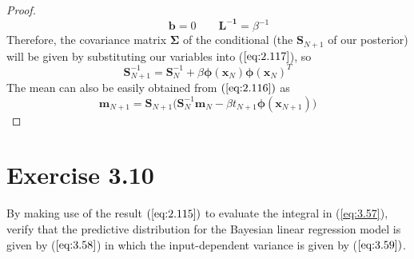 \begin{proof}
\begin{equation*}
        \hspace{2em}
        \mathbf{b} = 0
        \hspace{2em}
        \mathbf{L^{-1}} = \beta^{-1}
    \end{equation*}
    Therefore, the covariance matrix $\mathbf{\Sigma}$ of the conditional (the $\mathbf{S}_{N + 1}$ 
    of our posterior) will be given by substituting our variables into ($\ref{eq:2.117}$), so
    \begin{equation*}
        \mathbf{S}_{N + 1}^{-1} = \mathbf{S}_N^{-1} + \beta \bm{\phi}(\mathbf{x}_N)\bm{\phi}(\mathbf{x}_N)^T
    \end{equation*}
    The mean can also be easily obtained from $(\ref{eq:2.116})$ as
    \begin{equation*}
        \mathbf{m}_{N + 1}
        = \mathbf{S}_{N + 1}\big(\mathbf{S}_N^{-1} \mathbf{m}_N 
             - \beta t_{N + 1} \bm{\phi}(\mathbf{x}_{N + 1})\big)
    \end{equation*}
\end{proof}

\section*{Exercise 3.10}
By making use of the result $(\ref{eq:2.115})$ to evaluate the integral
in (\ref{eq:3.57}), verify that the predictive distribution for the Bayesian linear
regression model is given by ($\ref{eq:3.58}$) in which the input-dependent variance is
given by ($\ref{eq:3.59})$.

\vspace{1em}

